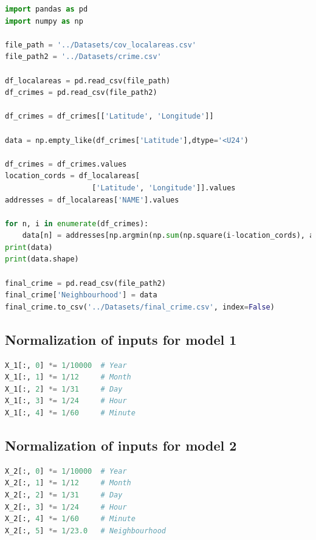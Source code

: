 \documentclass[conference]{IEEEtran}
\begin{document}
    \begin{lstlisting}[language=Python, caption=Neighborhood Column Adder]
import pandas as pd
import numpy as np

file_path = '../Datasets/cov_localareas.csv'
file_path2 = '../Datasets/crime.csv'

df_localareas = pd.read_csv(file_path)
df_crimes = pd.read_csv(file_path2)

df_crimes = df_crimes[['Latitude', 'Longitude']] 

data = np.empty_like(df_crimes['Latitude'],dtype='<U24')

df_crimes = df_crimes.values
location_cords = df_localareas[
                    ['Latitude', 'Longitude']].values
addresses = df_localareas['NAME'].values

for n, i in enumerate(df_crimes):
    data[n] = addresses[np.argmin(np.sum(np.square(i-location_cords), axis=1))]
print(data)
print(data.shape)

final_crime = pd.read_csv(file_path2)
final_crime['Neighbourhood'] = data
final_crime.to_csv('../Datasets/final_crime.csv', index=False)\end{lstlisting}


\subsection{Normalization of inputs for model 1}

\begin{lstlisting}[language=Python, caption=Normalizing Input of model 1]
X_1[:, 0] *= 1/10000  # Year
X_1[:, 1] *= 1/12     # Month
X_1[:, 2] *= 1/31     # Day
X_1[:, 3] *= 1/24     # Hour
X_1[:, 4] *= 1/60     # Minute\end{lstlisting}

\subsection{Normalization of inputs for model 2}

\begin{lstlisting}[language=Python, caption=Normalizing Input of model 2]
X_2[:, 0] *= 1/10000  # Year
X_2[:, 1] *= 1/12     # Month
X_2[:, 2] *= 1/31     # Day
X_2[:, 3] *= 1/24     # Hour
X_2[:, 4] *= 1/60     # Minute
X_2[:, 5] *= 1/23.0   # Neighbourhood\end{lstlisting}
\end{document}
